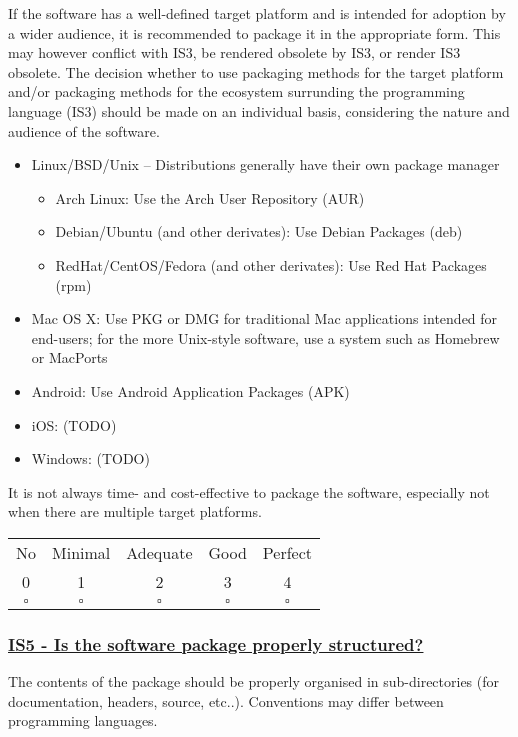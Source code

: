 \documentclass[a4paper,11pt]{article}
\newcommand{\criterion}[2]{\subsubsection*{\underline{#1 - #2}}\label{id:#1}}
\newcommand\CheckTable{%
  \begin{tabular}{ccccc}
    No & Minimal & Adequate & Good & Perfect \\
    0 & 1 & 2 & 3 & 4 \\
    \hline
    $\square$ & $\square$ & $\square$ & $\square$ & $\square$ \\
  \end{tabular}%
}
\begin{document}
If the software has a well-defined target platform and is intended for adoption
by a wider audience, it is recommended to package it in the appropriate form.
This may however conflict with IS3, be rendered obsolete by IS3, or render IS3
obsolete. The decision whether to use packaging methods for the target platform
and/or packaging methods for the ecosystem surrunding the programming language
(IS3) should be
%
%
%
made on an individual basis, considering the nature and audience of the
software.

\begin{itemize}
    \item Linux/BSD/Unix -- Distributions generally have their own package manager
    \begin{itemize}
        \item Arch Linux: Use the Arch User Repository (AUR)
        \item Debian/Ubuntu (and other derivates): Use Debian Packages (deb)
        \item RedHat/CentOS/Fedora (and other derivates): Use Red Hat Packages (rpm)
    \end{itemize}
    \item Mac OS X: Use PKG or DMG for traditional Mac applications intended for end-users; for the more Unix-style
        software, use a system such as Homebrew or MacPorts
    \item Android: Use Android Application Packages (APK)
    \item iOS: (TODO) 
    \item Windows: (TODO) 
\end{itemize}

It is not always time- and cost-effective to package the software, especially not
when there are multiple target platforms. 

\CheckTable

\newcommand{\isFiveID}{IS5}
\newcommand{\isFiveText}{Is the software package properly structured?}
\criterion{\isFiveID}{\isFiveText}

The contents of the package should be properly organised in sub-directories
(for documentation, headers, source, etc..). Conventions may differ between
programming languages.
\end{document}
